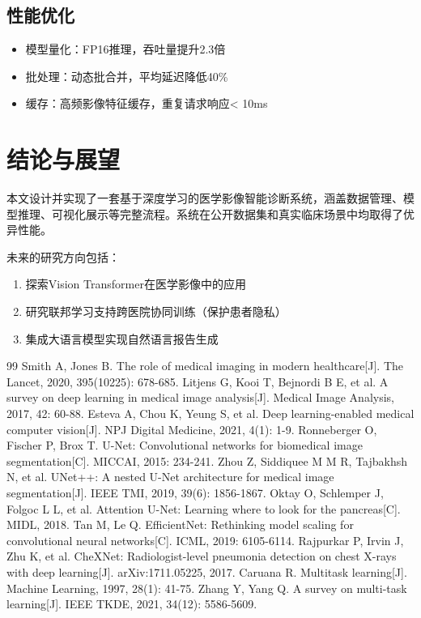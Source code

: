 \documentclass{harryopo-book}
\begin{document}
\subsection{性能优化}

\begin{itemize}
  \item {\fzht 模型量化}：FP16推理，吞吐量提升2.3倍
  \item {\fzht 批处理}：动态批合并，平均延迟降低40\%
  \item {\fzht 缓存}：高频影像特征缓存，重复请求响应< 10ms
\end{itemize}

\section{结论与展望}

本文设计并实现了一套基于深度学习的医学影像智能诊断系统，涵盖数据管理、模型推理、可视化展示等完整流程。系统在公开数据集和真实临床场景中均取得了优异性能。

未来的研究方向包括：

\begin{enumerate}
  \item 探索Vision Transformer在医学影像中的应用
  \item 研究联邦学习支持跨医院协同训练（保护患者隐私）
  \item 集成大语言模型实现自然语言报告生成
\end{enumerate}

\begin{thebibliography}{99}
 Smith A, Jones B. The role of medical imaging in modern healthcare[J]. The Lancet, 2020, 395(10225): 678-685.
 Litjens G, Kooi T, Bejnordi B E, et al. A survey on deep learning in medical image analysis[J]. Medical Image Analysis, 2017, 42: 60-88.
 Esteva A, Chou K, Yeung S, et al. Deep learning-enabled medical computer vision[J]. NPJ Digital Medicine, 2021, 4(1): 1-9.
 Ronneberger O, Fischer P, Brox T. U-Net: Convolutional networks for biomedical image segmentation[C]. MICCAI, 2015: 234-241.
 Zhou Z, Siddiquee M M R, Tajbakhsh N, et al. UNet++: A nested U-Net architecture for medical image segmentation[J]. IEEE TMI, 2019, 39(6): 1856-1867.
 Oktay O, Schlemper J, Folgoc L L, et al. Attention U-Net: Learning where to look for the pancreas[C]. MIDL, 2018.
 Tan M, Le Q. EfficientNet: Rethinking model scaling for convolutional neural networks[C]. ICML, 2019: 6105-6114.
 Rajpurkar P, Irvin J, Zhu K, et al. CheXNet: Radiologist-level pneumonia detection on chest X-rays with deep learning[J]. arXiv:1711.05225, 2017.
 Caruana R. Multitask learning[J]. Machine Learning, 1997, 28(1): 41-75.
 Zhang Y, Yang Q. A survey on multi-task learning[J]. IEEE TKDE, 2021, 34(12): 5586-5609.
\end{thebibliography}
\end{document}
